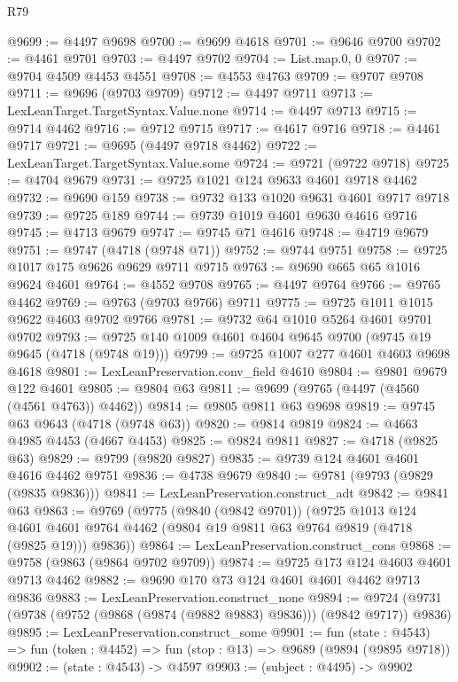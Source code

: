 \begin{lexlean}{R79}
\begin{coremodule}
@9699 := @4497 @9698
@9700 := @9699 @4618
@9701 := @9646 @9700
@9702 := @4461 @9701
@9703 := @4497 @9702
@9704 := List.map.{0, 0}
@9707 := @9704 @4509 @4453 @4551
@9708 := @4553 @4763
@9709 := @9707 @9708
@9711 := @9696 (@9703 @9709)
@9712 := @4497 @9711
@9713 := LexLeanTarget.TargetSyntax.Value.none
@9714 := @4497 @9713
@9715 := @9714 @4462
@9716 := @9712 @9715
@9717 := @4617 @9716
@9718 := @4461 @9717
@9721 := @9695 (@4497 @9718 @4462)
@9722 := LexLeanTarget.TargetSyntax.Value.some
@9724 := @9721 (@9722 @9718)
@9725 := @4704 @9679
@9731 := @9725 @1021 @124 @9633 @4601 @9718 @4462
@9732 := @9690 @159
@9738 := @9732 @133 @1020 @9631 @4601 @9717 @9718
@9739 := @9725 @189
@9744 := @9739 @1019 @4601 @9630 @4616 @9716
@9745 := @4713 @9679
@9747 := @9745 @71 @4616
@9748 := @4719 @9679
@9751 := @9747 (@4718 (@9748 @71))
@9752 := @9744 @9751
@9758 := @9725 @1017 @175 @9626 @9629 @9711 @9715
@9763 := @9690 @665 @65 @1016 @9624 @4601
@9764 := @4552 @9708
@9765 := @4497 @9764
@9766 := @9765 @4462
@9769 := @9763 (@9703 @9766) @9711
@9775 := @9725 @1011 @1015 @9622 @4603 @9702 @9766
@9781 := @9732 @64 @1010 @5264 @4601 @9701 @9702
@9793 := @9725 @140 @1009 @4601 @4604 @9645 @9700 (@9745 @19 @9645 (@4718 (@9748 @19)))
@9799 := @9725 @1007 @277 @4601 @4603 @9698 @4618
@9801 := LexLeanPreservation.conv_field @4610
@9804 := @9801 @9679 @122 @4601
@9805 := @9804 @63
@9811 := @9699 (@9765 (@4497 (@4560 (@4561 @4763)) @4462))
@9814 := @9805 @9811 @63 @9698
@9819 := @9745 @63 @9643 (@4718 (@9748 @63))
@9820 := @9814 @9819
@9824 := @4663 @4985 @4453 (@4667 @4453)
@9825 := @9824 @9811
@9827 := @4718 (@9825 @63)
@9829 := @9799 (@9820 @9827)
@9835 := @9739 @124 @4601 @4601 @4616 @4462 @9751
@9836 := @4738 @9679
@9840 := @9781 (@9793 (@9829 (@9835 @9836)))
@9841 := LexLeanPreservation.construct_adt
@9842 := @9841 @63
@9863 := @9769
    (@9775
      (@9840 (@9842 @9701))
      (@9725
        @1013
        @124
        @4601
        @4601
        @9764
        @4462
        (@9804 @19 @9811 @63 @9764 @9819 (@4718 (@9825 @19)))
        @9836))
@9864 := LexLeanPreservation.construct_cons
@9868 := @9758 (@9863 (@9864 @9702 @9709))
@9874 := @9725 @173 @124 @4603 @4601 @9713 @4462
@9882 := @9690 @170 @73 @124 @4601 @4601 @4462 @9713 @9836
@9883 := LexLeanPreservation.construct_none
@9894 := @9724 (@9731 (@9738 (@9752 (@9868 (@9874 (@9882 @9883) @9836))) (@9842 @9717)) @9836)
@9895 := LexLeanPreservation.construct_some
@9901 := fun (state : @4543) =>
  fun (token : @4452) => fun (stop : @13) => @9689 (@9894 (@9895 @9718))
@9902 := (state : @4543) -> @4597
@9903 := (subject : @4495) -> @9902

\end{coremodule}
\end{lexlean}
